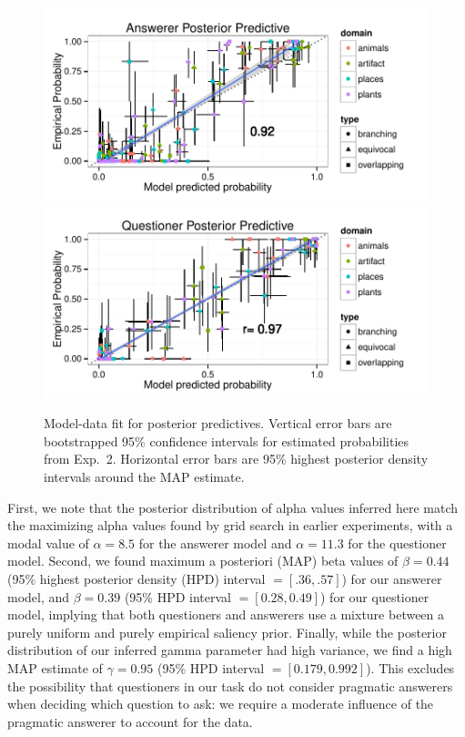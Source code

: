 \documentclass[12pt, floatsintext, jou]{apa6}
\begin{document}
\begin{figure}[t!]
\begin{center}
\includegraphics[scale=1]{AnswererPredictive.pdf}
\includegraphics[scale=1]{QuestionerPredictive.pdf}
\end{center}
\caption{Model-data fit for posterior predictives. Vertical error bars are bootstrapped 95\% confidence intervals for estimated probabilities from Exp.~2. Horizontal error bars are 95\% highest posterior density intervals around the MAP estimate.}
\label{fig:posteriorPredictives}
\end{figure}

First, we note that the posterior distribution of alpha values inferred here match the maximizing alpha values found by grid search in earlier experiments, with a modal value of $\alpha = 8.5$ for the answerer model and $\alpha = 11.3$ for the questioner model. Second, we found maximum a posteriori (MAP) beta values of $\beta = 0.44$ (95\% highest posterior density (HPD) interval $= [.36, .57]$) for our answerer model, and $\beta = 0.39$ (95\% HPD interval $= [0.28, 0.49]$) for our questioner model, implying that both questioners and answerers use a mixture between a purely uniform and purely empirical saliency prior. Finally, while the posterior distribution of our inferred gamma parameter had high variance, we find a high MAP estimate of $\gamma = 0.95$ (95\% HPD interval $= [0.179, 0.992]$). This excludes the possibility that questioners in our task do not consider pragmatic answerers when deciding which question to ask: we require a moderate influence of the pragmatic answerer to account for the data. 
\end{document}
